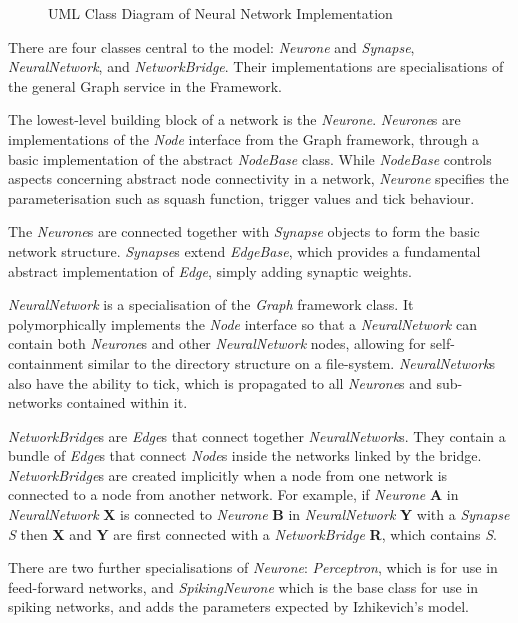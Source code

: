 \documentclass{acm_proc_article-sp}
\begin{document}
{\begin{figure}[t]
{}
\caption{UML Class Diagram of Neural Network Implementation}
\label{fig:neural:uml}
\end{figure}
There are four classes central to the model: {\textit{Neurone}} and {\textit{Synapse}}, {\textit{NeuralNetwork}}, and {\textit{NetworkBridge}}. Their implementations are specialisations of the general Graph service in the Framework. 

The lowest-level building block of a network is the {\textit{Neurone}}. {\textit{Neurone}}s are implementations of the {\textit{Node}} interface from the Graph framework, through a basic implementation of the abstract {\textit{NodeBase}} class. While {\textit{NodeBase}} controls aspects concerning abstract node connectivity in a network, {\textit{Neurone}} specifies the parameterisation such as squash function, trigger values and tick behaviour. 

The {\textit{Neurone}}s are connected together with {\textit{Synapse}} objects to form the basic network structure. {\textit{Synapse}}s extend {\textit{EdgeBase}}, which provides a fundamental abstract implementation of {\textit{Edge}}, simply adding synaptic weights.

{\textit{NeuralNetwork}} is a specialisation of the {\textit{Graph}} framework class. It polymorphically implements the {\textit{Node}} interface so that a {\textit{NeuralNetwork}} can contain both {\textit{Neurone}}s and other {\textit{NeuralNetwork}} nodes, allowing for self-containment similar to the directory structure on a file-system. {\textit{NeuralNetwork}}s also have the ability to tick, which is propagated to all {\textit{Neurone}}s and sub{}-networks contained within it.

{\textit{NetworkBridge}}s are {\textit{Edge}}s that connect together {\textit{NeuralNetwork}}s. They contain a bundle of {\textit{Edge}}s that connect {\textit{Node}}s inside the networks linked by the bridge. {\textit{NetworkBridge}}s are created implicitly when a node from one network is connected to a node from another network. For example, if {\textit{Neurone}} {\textbf{A}} in {\textit{NeuralNetwork}} {\textbf{X}} is connected to {\textit{Neurone}} {\textbf{B}} in {\textit{NeuralNetwork}} {\textbf{Y}} with a {\textit{Synapse}} {\textit{S}} then {\textbf{X}} and {\textbf{Y}} are first connected with a {\textit{NetworkBridge}} {\textbf{R}}, which contains {\textit{S}}.
\newpage

There are two further specialisations of {\textit{Neurone}}: {\textit{Perceptron}}, which is for use in feed-forward networks, and {\textit{SpikingNeurone}} which is the base class for use in spiking networks, and adds the parameters expected by Izhikevich's model.

}
\end{document}
